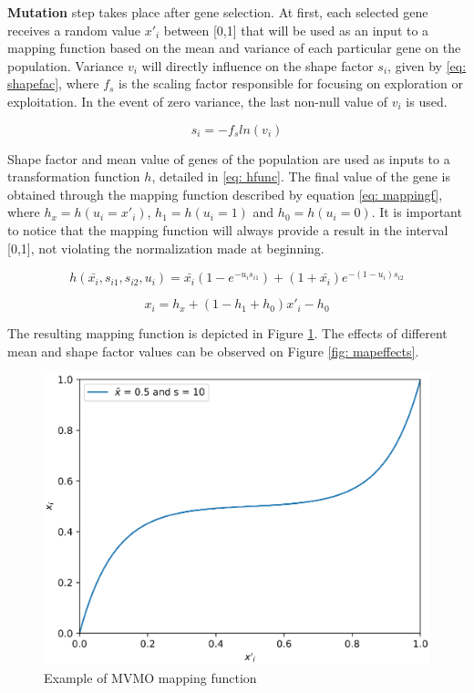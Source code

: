 \textbf{Mutation} step takes place after gene selection. At first, each selected gene receives a random value $x'_{i}$ between [0,1] that will be used as an input to a mapping function based on the mean and variance of each particular gene on the population. Variance $v_{i}$ will directly influence on the shape factor $s_{i}$,  given by \eqref{eq: shapefac}, where $f_{s}$ is the scaling factor responsible for focusing on exploration or exploitation. In the event of zero variance, the last non-null value of $v_{i}$ is used.

\begin{equation}
	s_{i} = -f_{s}ln(v_{i})
	\label{eq: shapefac}
\end{equation}

Shape factor and mean value of genes of the population are used as inputs to a transformation function $h$, detailed in \eqref{eq: hfunc}. The final value of the gene is obtained through the mapping function described by equation \eqref{eq: mappingf}, where $h_{x} = h(u_{i} = x'_{i})$, $h_{1} = h(u_{i} = 1)$ and $h_{0} = h(u_{i} = 0)$. It is important to notice that the mapping function will always provide a result in the interval [0,1], not violating the normalization made at beginning.

\begin{equation}
	h(\bar{x_{i}}, s_{i1}, s_{i2}, u_{i}) = \bar{x_{i}}(1 - e^{-u_{i}s_{i1}}) + (1 + \bar{x_{i}})e^{-(1 - u_{i})s_{i2}}
	\label{eq: hfunc}
\end{equation}

\begin{equation}
	x_{i} = h_{x} + (1 - h_{1} + h_{0})x'_{i} - h_{0}
	\label{eq: mappingf}
\end{equation}

The resulting mapping function is depicted in Figure \ref{fig: mappingf}. The effects of different mean and shape factor values can be observed on Figure \ref{fig: mapeffects}.

\begin{figure}[!h]
	\caption{Example of MVMO mapping function}
	\begin{center}
		\includegraphics[scale=.5]{Images/MVMOTransformation.eps}
	\end{center}
	\label{fig: mappingf}
\end{figure}

